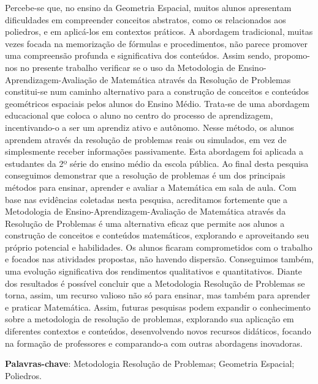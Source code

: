 \begin{resumo}
    Percebe-se que, no ensino da Geometria Espacial, muitos alunos apresentam dificuldades em compreender conceitos abstratos, como os relacionados aos poliedros, e em aplicá-los em contextos práticos. A abordagem tradicional, muitas vezes focada na memorização de fórmulas e procedimentos, não parece promover uma compreensão profunda e significativa dos conteúdos. Assim sendo, propomo-nos no presente trabalho verificar se o uso da Metodologia de Ensino-Aprendizagem-Avaliação de Matemática através da Resolução de Problemas constitui-se num caminho alternativo para a construção de conceitos e conteúdos geométricos espaciais pelos alunos do Ensino Médio. Trata-se de uma abordagem educacional que coloca o aluno no centro do processo de aprendizagem, incentivando-o a ser um aprendiz ativo e autônomo. Nesse método, os alunos aprendem através da resolução de problemas reais ou simulados, em vez de simplesmente receber informações passivamente. Esta abordagem foi aplicada a estudantes da 2º série do ensino médio da escola pública. Ao final desta pesquisa conseguimos demonstrar que a resolução de problemas é um dos principais métodos para ensinar, aprender e avaliar a Matemática em sala de aula. Com base nas evidências coletadas nesta pesquisa, acreditamos fortemente que a Metodologia de Ensino-Aprendizagem-Avaliação de Matemática através da Resolução de Problemas é uma alternativa eficaz que permite aos alunos a construção de conceitos e conteúdos matemáticos, explorando e aproveitando seu próprio potencial e habilidades. Os alunos ficaram comprometidos com o trabalho e focados nas atividades propostas, não havendo dispersão. Conseguimos também, uma evolução significativa dos rendimentos qualitativos e quantitativos. Diante dos resultados é possível concluir que a Metodologia Resolução de Problemas se torna, assim, um recurso valioso não só para ensinar, mas também para aprender e praticar Matemática. Assim, futuras pesquisas podem expandir o conhecimento sobre a metodologia de resolução de problemas, explorando sua aplicação em diferentes contextos e conteúdos, desenvolvendo novos recursos didáticos, focando na formação de professores e comparando-a com outras abordagens inovadoras.

    \textbf{Palavras-chave}:  Metodologia Resolução de Problemas; Geometria Espacial; Poliedros.

\end{resumo}
